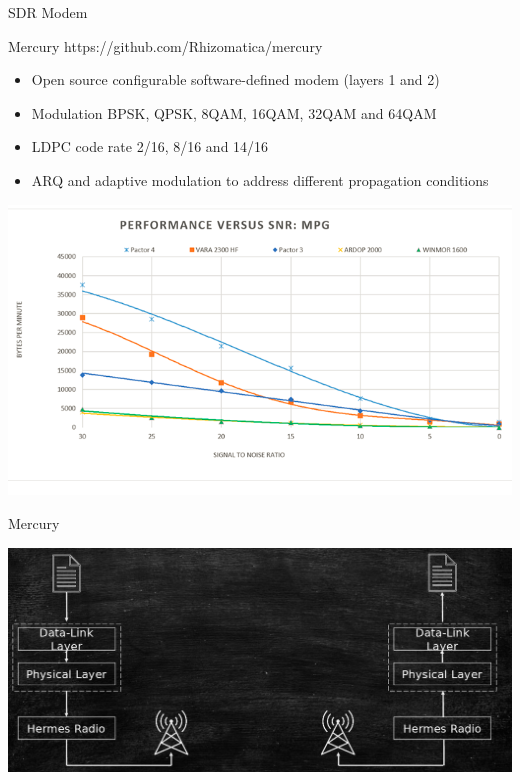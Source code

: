 \documentclass[aspectratio=169,xcolor={x11names,svgnames,dvipsnames}]{beamer}
\begin{document}
\begin{frame}{SDR Modem}

\begin{block}{Mercury https://github.com/Rhizomatica/mercury}
    \begin{itemize}
    \item Open source configurable software-defined modem (layers 1 and 2)
    \item Modulation BPSK, QPSK, 8QAM, 16QAM, 32QAM and 64QAM
    \item LDPC code rate 2/16, 8/16 and 14/16
    \item ARQ and adaptive modulation to address different propagation conditions
    \end{itemize}
\end{block}
\vspace{-0.25cm}
  \begin{center}
    \includegraphics[width=.54\columnwidth]{image_modems.png}
  \end{center}

\end{frame}


\begin{frame}{Mercury}

  \begin{center}
    \includegraphics[width=.95\columnwidth]{mercury1.jpg}
  \end{center}

\end{frame}
\end{document}
